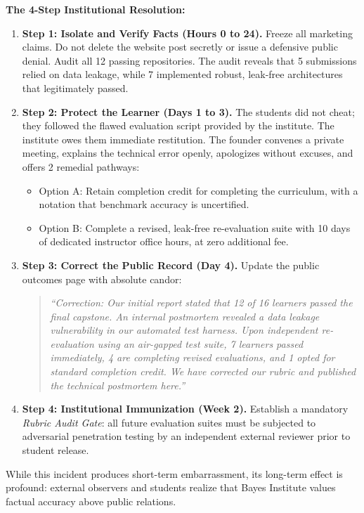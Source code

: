 \noindent\textbf{The 4-Step Institutional Resolution:}
\begin{enumerate}
\item \textbf{Step 1: Isolate and Verify Facts (Hours 0 to 24).} Freeze all marketing claims. Do not delete the website post secretly or issue a defensive public denial. Audit all 12 passing repositories. The audit reveals that 5 submissions relied on data leakage, while 7 implemented robust, leak-free architectures that legitimately passed.
\item \textbf{Step 2: Protect the Learner (Days 1 to 3).} The students did not cheat; they followed the flawed evaluation script provided by the institute. The institute owes them immediate restitution. The founder convenes a private meeting, explains the technical error openly, apologizes without excuses, and offers 2 remedial pathways:
  \begin{itemize}
  \item Option A: Retain completion credit for completing the curriculum, with a notation that benchmark accuracy is uncertified.
  \item Option B: Complete a revised, leak-free re-evaluation suite with 10 days of dedicated instructor office hours, at zero additional fee.
  \end{itemize}
\item \textbf{Step 3: Correct the Public Record (Day 4).} Update the public outcomes page with absolute candor:
  \begin{quote}
  \textit{``Correction: Our initial report stated that 12 of 16 learners passed the final capstone. An internal postmortem revealed a data leakage vulnerability in our automated test harness. Upon independent re-evaluation using an air-gapped test suite, 7 learners passed immediately, 4 are completing revised evaluations, and 1 opted for standard completion credit. We have corrected our rubric and published the technical postmortem here.''}
  \end{quote}
\item \textbf{Step 4: Institutional Immunization (Week 2).} Establish a mandatory \emph{Rubric Audit Gate}: all future evaluation suites must be subjected to adversarial penetration testing by an independent external reviewer prior to student release.
\end{enumerate}

While this incident produces short-term embarrassment, its long-term effect is profound: external observers and students realize that Bayes Institute values factual accuracy above public relations.

